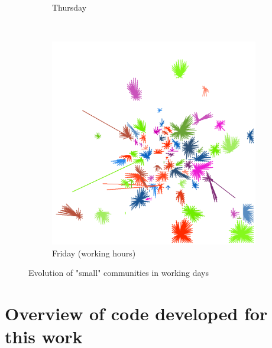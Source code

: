 \documentclass[12pt,a4paper]{article}
\begin{document}
\begin{figure}[H]
\begin{subfigure}[b]{0.48\textwidth}
\caption{Thursday}
\end{subfigure}
\\
\begin{subfigure}[b]{0.48\textwidth}
\includegraphics[width=\textwidth]{weekDef/edges-5Fri-small.png}
\caption{Friday (working hours)}
\end{subfigure}

\caption{Evolution of "small" communities in working days}
\end{figure}
\newpage

\section{Overview of code developed for this work}
\label{code}

\end{document}
